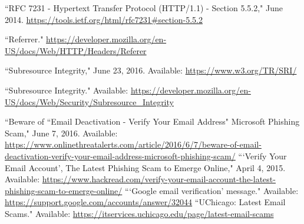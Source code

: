 \begin{thebibliography}{99}
\begin{singlespace}
``RFC 7231 - Hypertext Transfer Protocol (HTTP/1.1) - Section 5.5.2," June 2014. \url{https://tools.ietf.org/html/rfc7231#section-5.5.2}

``Referrer." \url{https://developer.mozilla.org/en-US/docs/Web/HTTP/Headers/Referer}

``Subresource Integrity," June 23, 2016. Available: \url{https://www.w3.org/TR/SRI/}

``Subresource Integrity." Available:  \url{https://developer.mozilla.org/en-US/docs/Web/Security/Subresource\_Integrity}

``Beware of ``Email Deactivation - Verify Your Email Address" Microsoft Phishing Scam," June 7, 2016. Available: \url{https://www.onlinethreatalerts.com/article/2016/6/7/beware-of-email-deactivation-verify-your-email-address-microsoft-phishing-scam/}
```Verify Your Email Account', The Latest Phishing Scam to Emerge Online," April 4, 2015. Available: \url{https://www.hackread.com/verify-your-email-account-the-latest-phishing-scam-to-emerge-online/}
```Google email verification' message." Available: \url{https://support.google.com/accounts/answer/32044}
``UChicago: Latest Email Scams." Available: \url{https://itservices.uchicago.edu/page/latest-email-scams}

\end{singlespace}
\end{thebibliography}